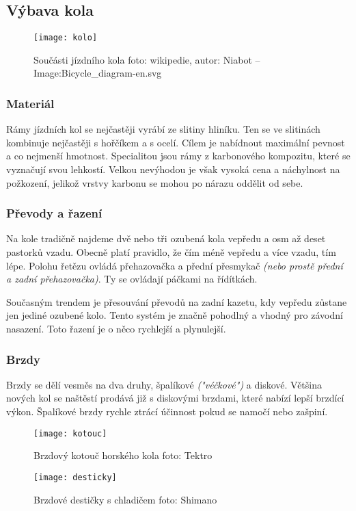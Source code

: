 \documentclass[11pt]{article}
\begin{document}
\newpage\subsection[Výbava jízdního kola]{Výbava kola}
\begin{figure}[h]
    \centering
    \texttt{[image: kolo]}
    \caption{Součásti jízdního kola  \tiny{foto: wikipedie, autor: Niabot – Image:Bicycle\_diagram-en.svg}}
    \label{fig:kolo}
\end{figure}
\subsubsection*{Materiál}
Rámy jízdních kol se nejčastěji vyrábí ze slitiny hliníku. Ten se ve slitinách kombinuje nejčastěji s hořčíkem a s ocelí. Cílem je nabídnout maximální pevnost a co nejmenší hmotnost.
Specialitou jsou rámy z karbonového kompozitu, které se vyznačují svou lehkostí. Velkou nevýhodou je však vysoká cena a náchylnost na požkození, jelikož vrstvy karbonu se mohou po nárazu oddělit od sebe.

\subsubsection*{Převody a řazení}
Na kole tradičně najdeme dvě nebo tři ozubená kola vepředu a osm až deset pastorků vzadu. Obecně platí pravidlo, že čím méně vepředu a více vzadu, tím lépe. Polohu řetězu ovládá přehazovačka a přední přesmykač \textit{(nebo prostě přední a zadní přehazovačka)}. Ty se ovládají páčkami na řídítkách. 

Současným trendem je přesouvání převodů na zadní kazetu, kdy vepředu zůstane jen jediné ozubené kolo. Tento systém je značně pohodlný a vhodný pro závodní nasazení. Toto řazení je o něco rychlejší a plynulejší.

\newpage
\subsubsection*{Brzdy}
Brzdy se dělí vesměs na dva druhy, špalíkové \textit{("véčkové")} a diskové. Většina nových kol se naštěstí prodává již s diskovými brzdami, které nabízí lepší brzdící výkon. Špalíkové brzdy rychle ztrácí účinnost pokud se namočí nebo zašpiní.\\
\begin{figure}[h!]
    \centering
    \begin{minipage}[b]{0.45\textwidth}
        \texttt{[image: kotouc]}
        \caption{Brzdový kotouč horského kola \newline{}\tiny{foto: Tektro}}
    \end{minipage}
    \hfill
    \begin{minipage}[b]{0.5\textwidth}
        \texttt{[image: desticky]}
        \caption{Brzdové destičky s chladičem \newline{}\tiny{foto: Shimano}}
    \end{minipage}
\end{figure}
\end{document}
